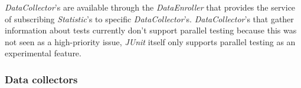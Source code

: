 \documentclass[i2]{oss}
\newcommand{\class}[1]{\emph{#1}}
\newcommand{\junit}{\emph{JUnit }}
\begin{document}
\class{DataCollector}'s are available through the \class{DataEnroller}
that provides the service of subscribing \class{Statistic}'s to specific
\class{DataCollector}'s.
\class{DataCollector}'s that gather information about tests currently
don't support parallel testing because this was not seen as a 
high-priority issue, \junit itself only supports parallel testing as an
experimental feature.







\subsubsection{Data collectors}
\label{subssec:Data collectors}
\end{document}
